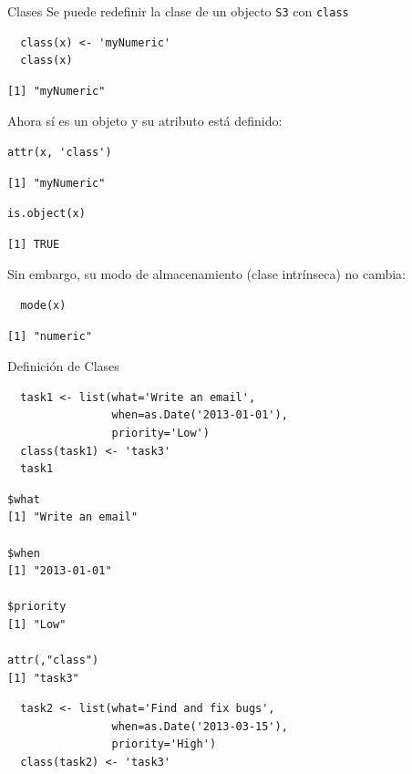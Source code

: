\documentclass[xcolor={usenames,svgnames,dvipsnames}]{beamer}
\begin{document}
\begin{frame}[fragile,label={sec:orgheadline6}]{Clases}
 Se puede redefinir la clase de un objecto \texttt{S3} con \texttt{class}
\lstset{language=R,label= ,caption= ,captionpos=b,numbers=none}
\begin{lstlisting}
  class(x) <- 'myNumeric'
  class(x)
\end{lstlisting}

\begin{verbatim}
[1] "myNumeric"
\end{verbatim}

Ahora sí es un objeto y su atributo está definido:
\lstset{language=R,label= ,caption= ,captionpos=b,numbers=none}
\begin{lstlisting}
attr(x, 'class')
\end{lstlisting}

\begin{verbatim}
[1] "myNumeric"
\end{verbatim}

\lstset{language=R,label= ,caption= ,captionpos=b,numbers=none}
\begin{lstlisting}
is.object(x)
\end{lstlisting}

\begin{verbatim}
[1] TRUE
\end{verbatim}

Sin embargo, su modo de almacenamiento (clase intrínseca) no cambia:
\lstset{language=R,label= ,caption= ,captionpos=b,numbers=none}
\begin{lstlisting}
  mode(x)
\end{lstlisting}

\begin{verbatim}
[1] "numeric"
\end{verbatim}
\end{frame}

\begin{frame}[fragile,label={sec:orgheadline7}]{Definición de Clases}
 \lstset{language=R,label= ,caption= ,captionpos=b,numbers=none}
\begin{lstlisting}
  task1 <- list(what='Write an email',
                when=as.Date('2013-01-01'),
                priority='Low')
  class(task1) <- 'task3'
  task1
\end{lstlisting}

\begin{verbatim}
$what
[1] "Write an email"

$when
[1] "2013-01-01"

$priority
[1] "Low"

attr(,"class")
[1] "task3"
\end{verbatim}

\lstset{language=R,label= ,caption= ,captionpos=b,numbers=none}
\begin{lstlisting}
  task2 <- list(what='Find and fix bugs',
                when=as.Date('2013-03-15'),
                priority='High')
  class(task2) <- 'task3'
\end{lstlisting}
\end{frame}
\end{document}

